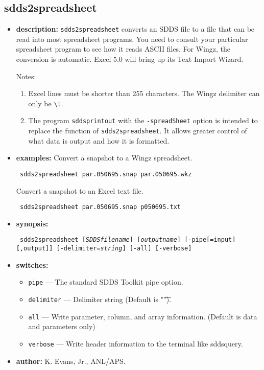 \newpage 
\subsection{sdds2spreadsheet} 
\label{sdds2spreadsheet} 
 
\begin{itemize} 
\item {\bf description:} 
\verb|sdds2spreadsheet| converts an SDDS file to a file that can be read into most spreadsheet programs. 
You need to consult your particular spreadsheet program to see how it reads ASCII files.  For Wingz, the 
conversion is automatic.  Excel 5.0 will bring up its Text Import Wizard. 
 
Notes:  
\begin{enumerate} 
\item Excel lines must be shorter than 255 characters.   
The Wingz delimiter can only be \verb|\t|. 
\item The program \verb|sddsprintout| with the \verb|-spreadSheet|  
option is intended to replace the function of \verb|sdds2spreadsheet|. 
It allows greater control of what data is output and how it is 
formatted. 
\end{enumerate} 
 
\item {\bf examples:}  
Convert a snapshot to a Wingz spreadsheet. 
\begin{flushleft}{\tt 
sdds2spreadsheet par.050695.snap par.050695.wkz 
}\end{flushleft} 
Convert a snapshot to an Excel text file. 
\begin{flushleft}{\tt 
sdds2spreadsheet par.050695.snap p050695.txt 
}\end{flushleft} 
\item {\bf synopsis:}  
\begin{flushleft}{\tt 
sdds2spreadsheet [{\em SDDSfilename}] [{\em outputname}]  
  [-pipe[=input][,output]] [-delimiter={\em string}] 
 [-all] [-verbose] 
}\end{flushleft} 
\item {\bf switches:} 
    \begin{itemize} 
    \item \verb|pipe| --- The standard SDDS Toolkit pipe option. 
    \item \verb|delimiter| --- Delimiter string (Default is "\t"). 
    \item \verb|all| --- Write parameter, column, and array information.
               (Default is data and parameters only) 
    \item \verb|verbose| --- Write header information to the terminal like sddsquery. 
    \end{itemize} 
\item {\bf author:} K. Evans, Jr., ANL/APS. 
\end{itemize} 
 
 
 

